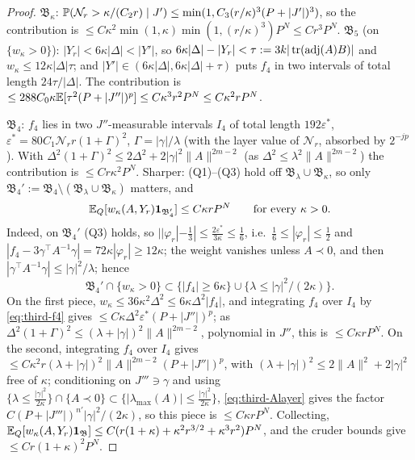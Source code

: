 \begin{proof}
$\mathfrak B_\kappa$: $\mathbb P(\mathcal N_r>\kappa/(C_2r)\mid J')\le\min(1,C_3(r/\kappa)^3(P+|J'|)^3)$, so the contribution is $\le C\kappa^2\min(1,\kappa)\min(1,(r/\kappa)^3)P^N\le Cr^3P^N$.
$\mathfrak B_5$ (on $\{w_\kappa>0\}$): $|Y_r|<6\kappa|\Delta|<|Y'|$, so $6\kappa|\Delta|-|Y_r|<\tau:=3k|\operatorname{tr}(\operatorname{adj}(A)B)|$ and $w_\kappa\le12\kappa|\Delta|\tau$; and $|Y'|\in(6\kappa|\Delta|,6\kappa|\Delta|+\tau)$ puts $f_4$ in two intervals of total length $24\tau/|\Delta|$. The contribution is $\le288C_0\kappa\mathbb E[\tau^2(P+|J''|)^p]\le C\kappa^3r^2P^N\le C\kappa^2rP^N$.

$\mathfrak B_4$: $f_4$ lies in two $J''$-measurable intervals $I_4$ of total length $192\varepsilon^*$, $\varepsilon^*=80C_1\mathcal N_rr(1+\Gamma)^2$, $\Gamma=|\gamma|/\lambda$ (with the layer value of $\mathcal N_r$, absorbed by $2^{-jp}$). With $\Delta^2(1+\Gamma)^2\le2\Delta^2+2|\gamma|^2\|A\|^{2m-2}$ (as $\Delta^2\le\lambda^2\|A\|^{2m-2}$) the contribution is $\le Cr\kappa^2P^N$. Sharper: (Q1)--(Q3) hold off $\mathfrak B_\lambda\cup\mathfrak B_\kappa$, so only $\mathfrak B_4':=\mathfrak B_4\setminus(\mathfrak B_\lambda\cup\mathfrak B_\kappa)$ matters, and
\begin{equation}\label{eq:third-B4}
\mathbb E_Q[w_\kappa(A,Y_r)\mathbf 1_{\mathfrak B_4'}]\le C\kappa rP^N\qquad\text{for every }\kappa>0.
\end{equation}
Indeed, on $\mathfrak B_4'$ (Q3) holds, so $||\varphi_r|-\frac13|\le\frac{2\varepsilon^*}{3\kappa}\le\frac16$, i.e.\ $\frac16\le|\varphi_r|\le\frac12$ and $|f_4-3\gamma^\top A^{-1}\gamma|=72\kappa|\varphi_r|\ge12\kappa$; the weight vanishes unless $A\prec0$, and then $|\gamma^\top A^{-1}\gamma|\le|\gamma|^2/\lambda$; hence
\begin{equation}\label{eq:third-B4incl}
\mathfrak B_4'\cap\{w_\kappa>0\}\subset\{|f_4|\ge6\kappa\}\cup\{\lambda\le|\gamma|^2/(2\kappa)\}.
\end{equation}
On the first piece, $w_\kappa\le36\kappa^2\Delta^2\le6\kappa\Delta^2|f_4|$, and integrating $f_4$ over $I_4$ by \eqref{eq:third-f4} gives $\le C\kappa\Delta^2\varepsilon^*(P+|J''|)^p$; as $\Delta^2(1+\Gamma)^2\le(\lambda+|\gamma|)^2\|A\|^{2m-2}$, polynomial in $J''$, this is $\le C\kappa rP^N$. On the second, integrating $f_4$ over $I_4$ gives $\le C\kappa^2r(\lambda+|\gamma|)^2\|A\|^{2m-2}(P+|J''|)^p$, with $(\lambda+|\gamma|)^2\le2\|A\|^2+2|\gamma|^2$ free of $\kappa$; conditioning on $J'''\ni\gamma$ and using $\{\lambda\le\frac{|\gamma|^2}{2\kappa}\}\cap\{A\prec0\}\subset\{|\lambda_{\max}(A)|\le\frac{|\gamma|^2}{2\kappa}\}$, \eqref{eq:third-Alayer} gives the factor $C(P+|J'''|)^{n'}|\gamma|^2/(2\kappa)$, so this piece is $\le C\kappa rP^N$. Collecting, $\mathbb E_Q[w_\kappa(A,Y_r)\mathbf 1_{\mathfrak B}]\le C(r(1+\kappa)+\kappa^2r^{3/2}+\kappa^3r^2)P^N$, and the cruder bounds give $\le Cr(1+\kappa)^2P^N$.


\end{proof}
